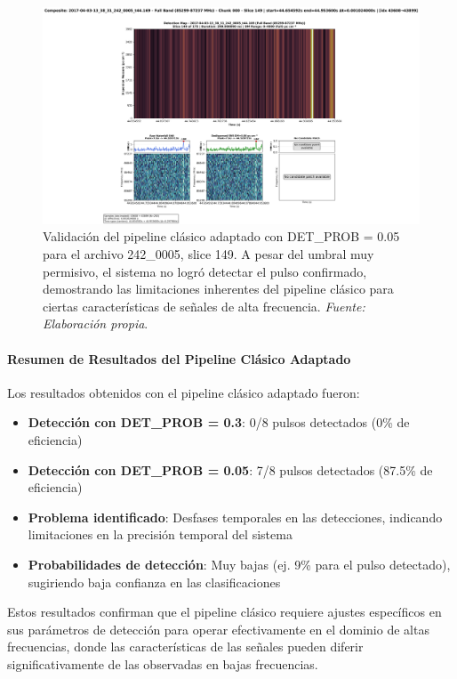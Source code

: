 \begin{figure}[H]
    \centering
    \includegraphics[width=\textwidth]{figures/2017-04-03-13_38_31_242_0005_t44.169_slice149-lowProb.png}
    \caption{Validación del pipeline clásico adaptado con DET\_PROB = 0.05 para el archivo 242\_0005, slice 149. A pesar del umbral muy permisivo, el sistema no logró detectar el pulso confirmado, demostrando las limitaciones inherentes del pipeline clásico para ciertas características de señales de alta frecuencia. \textit{Fuente: Elaboración propia}.}
    \label{fig:242_0005_slice149_lowProb}
\end{figure}

\paragraph{Resumen de Resultados del Pipeline Clásico Adaptado}

Los resultados obtenidos con el pipeline clásico adaptado fueron:

\begin{itemize}
    \item \textbf{Detección con DET\_PROB = 0.3}: 0/8 pulsos detectados (0\% de eficiencia)
    \item \textbf{Detección con DET\_PROB = 0.05}: 7/8 pulsos detectados (87.5\% de eficiencia)
    \item \textbf{Problema identificado}: Desfases temporales en las detecciones, indicando limitaciones en la precisión temporal del sistema
    \item \textbf{Probabilidades de detección}: Muy bajas (ej. 9\% para el pulso detectado), sugiriendo baja confianza en las clasificaciones
\end{itemize}

Estos resultados confirman que el pipeline clásico requiere ajustes específicos en sus parámetros de detección para operar efectivamente en el dominio de altas frecuencias, donde las características de las señales pueden diferir significativamente de las observadas en bajas frecuencias.

